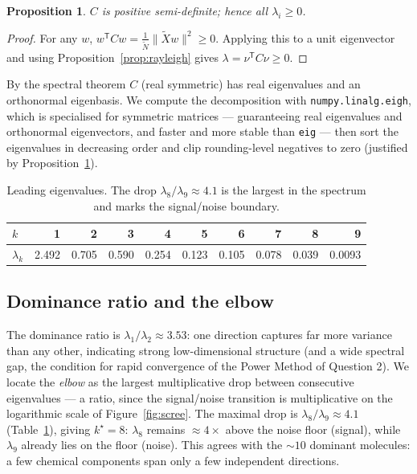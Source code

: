\documentclass[11pt]{article}
\newcommand{\Xt}{\widetilde{X}}
\newcommand{\Nt}{\widetilde{N}}
\newcommand{\norm}[1]{\lVert #1 \rVert}
\newcommand{\T}{^{\mathsf{T}}}
\theoremstyle{definition}
\theoremstyle{plain}
\newtheorem{proposition}{Proposition}[section]
\theoremstyle{remark}
\begin{document}
\begin{proposition}\label{prop:psd}
$C$ is positive semi-definite; hence all $\lambda_i\ge0$.
\end{proposition}
\begin{proof}
For any $w$, $w\T C w=\tfrac1{\Nt}\norm{\Xt w}^2\ge0$. Applying this to a unit eigenvector
and using Proposition~\ref{prop:rayleigh} gives $\lambda=\nu\T C\nu\ge0$.
\end{proof}

By the spectral theorem $C$ (real symmetric) has real eigenvalues and an orthonormal
eigenbasis. We compute the decomposition with \texttt{numpy.linalg.eigh}, which is
specialised for symmetric matrices --- guaranteeing real eigenvalues and orthonormal
eigenvectors, and faster and more stable than \texttt{eig} --- then sort the eigenvalues in
decreasing order and clip rounding-level negatives to zero (justified by
Proposition~\ref{prop:psd}).

\begin{table}[h]
\centering
\begin{tabular}{lrrrrrrrrr}
\toprule
$k$ & 1 & 2 & 3 & 4 & 5 & 6 & 7 & 8 & 9\\
\midrule
$\lambda_k$ & 2.492 & 0.705 & 0.590 & 0.254 & 0.123 & 0.105 & 0.078 & 0.039 & 0.0093\\
\bottomrule
\end{tabular}
\caption{Leading eigenvalues. The drop $\lambda_8/\lambda_9\approx4.1$ is the largest in the
spectrum and marks the signal/noise boundary.}
\label{tab:eig}
\end{table}

\subsection*{Dominance ratio and the elbow}
The dominance ratio is $\lambda_1/\lambda_2\approx3.53$: one direction captures far more
variance than any other, indicating strong low-dimensional structure (and a wide spectral
gap, the condition for rapid convergence of the Power Method of Question 2). We locate the
\emph{elbow} as the largest multiplicative drop between consecutive eigenvalues --- a ratio,
since the signal/noise transition is multiplicative on the logarithmic scale of
Figure~\ref{fig:scree}. The maximal drop is $\lambda_8/\lambda_9\approx4.1$
(Table~\ref{tab:eig}), giving $k^\star=8$: $\lambda_8$ remains $\approx4\times$ above the
noise floor (signal), while $\lambda_9$ already lies on the floor (noise). This agrees with
the $\sim10$ dominant molecules: a few chemical components span only a few independent
directions.
\end{document}
